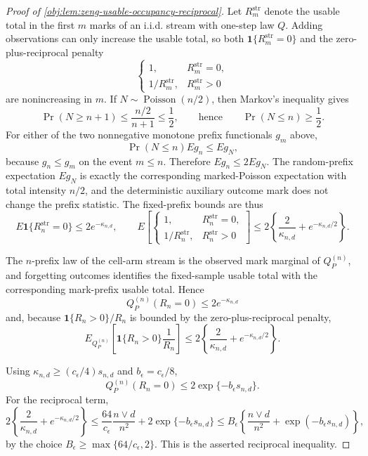 \documentclass[11pt]{article}
\begin{document}
\begin{proof}[Proof of \cref{obj:lem:zeng-usable-occupancy-reciprocal}]
Let \(R_m^{\mathrm{str}}\) denote the usable total in the first \(m\) marks of an i.i.d. stream with one-step law \(Q\).  Adding observations can only increase the usable total, so both \(\mathbf 1\{R_m^{\mathrm{str}}=0\}\) and the zero-plus-reciprocal penalty
\[
\begin{cases}
1,& R_m^{\mathrm{str}}=0,\\
1/R_m^{\mathrm{str}},& R_m^{\mathrm{str}}>0
\end{cases}
\]
are nonincreasing in \(m\).  If \(N\sim\operatorname{Poisson}(n/2)\), then Markov's inequality gives
\[
\Pr(N\ge n+1)\le \frac{n/2}{n+1}\le \frac12,
\qquad\text{hence}\qquad
\Pr(N\le n)\ge \frac12.
\]
For either of the two nonnegative monotone prefix functionals \(g_m\) above,
\[
\Pr(N\le n)E g_n\le E g_N,
\]
because \(g_n\le g_m\) on the event \(m\le n\).  Therefore \(E g_n\le 2E g_N\).  The random-prefix expectation \(E g_N\) is exactly the corresponding marked-Poisson expectation with total intensity \(n/2\), and the deterministic auxiliary outcome mark does not change the prefix statistic.  The fixed-prefix bounds are thus
\[
E\mathbf 1\{R_n^{\mathrm{str}}=0\}
\le 2e^{-\kappa_{n,d}},\qquad
E\left[\begin{cases}
1,& R_n^{\mathrm{str}}=0,\\
1/R_n^{\mathrm{str}},& R_n^{\mathrm{str}}>0
\end{cases}\right]
\le 2\left\{\frac{2}{\kappa_{n,d}}+e^{-\kappa_{n,d}/2}\right\}.
\]

The \(n\)-prefix law of the cell-arm stream is the observed mark marginal of \(Q_P^{(n)}\), and forgetting outcomes identifies the fixed-sample usable total with the corresponding mark-prefix usable total.  Hence
\[
Q_P^{(n)}(R_n=0)\le 2e^{-\kappa_{n,d}}
\]
and, because \(\mathbf 1\{R_n>0\}/R_n\) is bounded by the zero-plus-reciprocal penalty,
\[
E_{Q_P^{(n)}}\left[\mathbf 1\{R_n>0\}\frac1{R_n}\right]
\le
2\left\{\frac{2}{\kappa_{n,d}}+e^{-\kappa_{n,d}/2}\right\}.
\]

Using \(\kappa_{n,d}\ge(c_\epsilon/4)s_{n,d}\) and \(b_\epsilon=c_\epsilon/8\),
\[
Q_P^{(n)}(R_n=0)\le 2\exp\{-b_\epsilon s_{n,d}\}.
\]
For the reciprocal term,
\[
2\left\{\frac{2}{\kappa_{n,d}}+e^{-\kappa_{n,d}/2}\right\}
\le
\frac{64}{c_\epsilon}\frac{n\vee d}{n^2}
+2\exp\{-b_\epsilon s_{n,d}\}
\le
B_\epsilon\left\{\frac{n\vee d}{n^2}+\exp(-b_\epsilon s_{n,d})\right\},
\]
by the choice \(B_\epsilon\ge\max\{64/c_\epsilon,2\}\).  This is the asserted reciprocal inequality. %
\end{proof}
\end{document}
